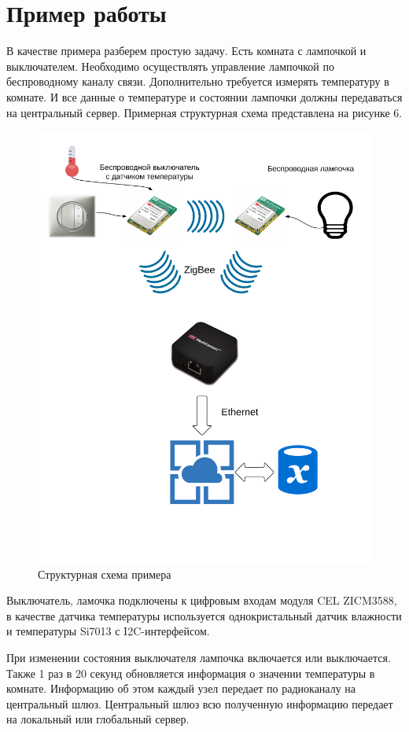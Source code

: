 \documentclass[11pt]{article}
\begin{document}
\section*{Пример работы}
В качестве примера разберем простую задачу. Есть комната с лампочкой и выключателем.
Необходимо осуществлять управление лампочкой по беспроводному каналу связи. Дополнительно
требуется измерять температуру в комнате. И все данные о температуре и состоянии лампочки
должны передаваться на центральный сервер. Примерная структурная схема представлена 
на рисунке 6.
\begin{figure}[h!]
    \centering
    \includegraphics[scale=0.5]{cel-structure.png}
    \caption{Структурная схема примера}
\end{figure}

Выключатель, ламочка подключены к цифровым входам модуля CEL ZICM3588, в качестве
датчика температуры используется однокристальный датчик влажности и температуры
Si7013 с I2C-интерфейсом.

При изменении состояния выключателя лампочка включается или выключается. Также 1 раз в 20
секунд обновляется информация о значении температуры в комнате. Информацию об этом
каждый узел передает по радиоканалу на центральный шлюз. Центральный шлюз всю
полученную информацию передает на локальный или глобальный сервер.
\end{document}
